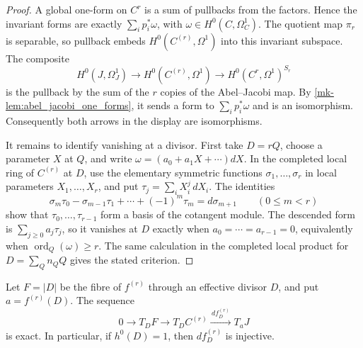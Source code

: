 \begin{proof}
  A global one-form on \(C^r\) is a sum of pullbacks from the factors.
  Hence the invariant forms are exactly
  \(\sum_i p_i^*\omega\), with \(\omega\in H^0(C,\Omega_C^1)\).
  The quotient map \(\pi_r\) is separable, so pullback embeds
  \(H^0(C^{(r)},\Omega^1)\) into this invariant subspace.  The composite
  \[
    H^0(J,\Omega_J^1)\longrightarrow H^0(C^{(r)},\Omega^1)
      \longrightarrow H^0(C^r,\Omega^1)^{S_r}
  \]
  is the pullback by the sum of the \(r\) copies of the Abel--Jacobi map.
  By \ref{mk-lem:abel_jacobi_one_forms}, it sends a form to
  \(\sum_i p_i^*\omega\) and is an isomorphism.  Consequently both arrows
  in the display are isomorphisms.

  It remains to identify vanishing at a divisor.  First take \(D=rQ\),
  choose a parameter \(X\) at \(Q\), and write
  \(\omega=(a_0+a_1X+\cdots)dX\).  In the completed local ring of
  \(C^{(r)}\) at \(D\), use the elementary symmetric functions
  \(\sigma_1,\ldots,\sigma_r\) in local parameters
  \(X_1,\ldots,X_r\), and put
  \(\tau_j=\sum_iX_i^j\,dX_i\).  The identities
  \[
    \sigma_m\tau_0-\sigma_{m-1}\tau_1+\cdots+(-1)^m\tau_m
      =d\sigma_{m+1}
      \qquad(0\le m<r)
  \]
  show that \(\tau_0,\ldots,\tau_{r-1}\) form a basis of the cotangent
  module.  The descended form is \(\sum_{j\ge0}a_j\tau_j\), so it
  vanishes at \(D\) exactly when
  \(a_0=\cdots=a_{r-1}=0\), equivalently when
  \(\operatorname{ord}_Q(\omega)\ge r\).  The same calculation in the
  completed local product for
  \(D=\sum_Q n_QQ\) gives the stated criterion.
\end{proof}

\begin{lemma}
  \label{mk-lem:symmetric_product_tangent_exact}

  Let \(F=|D|\) be the fibre of \(f^{(r)}\) through an effective divisor
  \(D\), and put \(a=f^{(r)}(D)\).  The sequence
  \[
    0\longrightarrow T_DF\longrightarrow T_DC^{(r)}
      \xrightarrow{\,d f^{(r)}_D\,}T_aJ
  \]
  is exact.  In particular, if \(h^0(D)=1\), then
  \(d f^{(r)}_D\) is injective.
\end{lemma}

